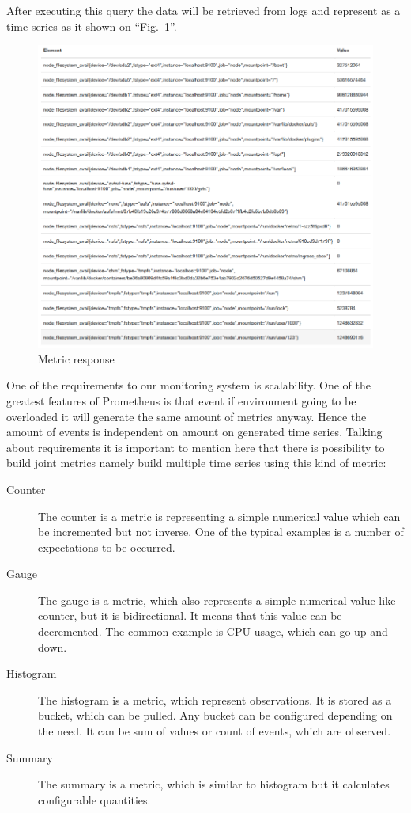 After executing this query the data will be retrieved from logs and represent as a time series as it shown on ``Fig.~\ref{fig:monitoring_req}''.



\begin{figure}[htbp]
\begin{center}
  \includegraphics[width=\linewidth]{components/3/monitoring_req.png}
  \caption{Metric response}
  \label{fig:monitoring_req}
\end{center}
\end{figure}

One of the requirements to our monitoring system is scalability. One of the greatest features of Prometheus is that event if environment going to be overloaded it will generate the same amount of metrics anyway. Hence the amount of events is independent on amount on generated time series. 
Talking about requirements it is important to mention here that there is possibility to build joint metrics namely build multiple time series using this kind of metric:

\begin{description}
\item[Counter] The counter is a metric is representing a simple numerical value which can be incremented but not inverse. One of the typical examples is a number of expectations to be occurred. 
\item[Gauge] The gauge is a metric, which also represents a simple numerical value like counter, but it is bidirectional. It means that this value can be decremented. The common example is CPU usage, which can go up and down.
\item[Histogram] The histogram is a metric, which represent observations.  It is stored as a bucket, which can be pulled. Any bucket can be configured depending on the need. It can be sum of values or count of events, which are observed.
\item[Summary] The summary is a metric, which is similar to histogram but it calculates configurable quantities. 
\end{description}

